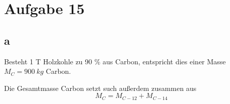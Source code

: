 \documentclass[12pt]{article}
\begin{document}
\section{Aufgabe 15}

\subsection{a}

Besteht 1 \si{T} Holzkohle zu 90 \% aus Carbon, entspricht dies einer Masse $M_C = 900 \ \si{kg}$ Carbon.

Die Gesamtmasse Carbon setzt such außerdem zusammen aus 
\begin{equation*}
    M_C = M_{C-12} + M_{C-14}
\end{equation*}
\end{document}
